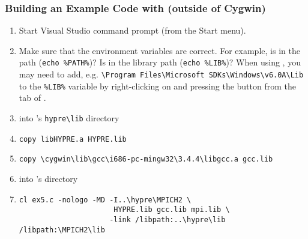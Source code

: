 \subsubsection{Building an Example Code with  (outside of Cygwin)}
\begin{enumerate}
\item Start Visual Studio command prompt (from the Start menu).
\item Make sure that the environment variables are correct. For example, is
 in the path (\verb|echo %PATH%|)? Is  in the
library path (\verb|echo %LIB%|)? When using , you may need to
add, e.g.
\verb|\Program Files\Microsoft SDKs\Windows\v6.0A\Lib| to the \verb|%LIB%|
variable by right-clicking on  and pressing the
 button from the  tab of
.
\item {} into \hypre{}'s \verb|hypre\lib| directory
\item \verb|copy libHYPRE.a HYPRE.lib|
\item \verb|copy \cygwin\lib\gcc\i686-pc-mingw32\3.4.4\libgcc.a gcc.lib|
\item {} into \hypre{}'s  directory
\item
\begin{verbatim}
cl ex5.c -nologo -MD -I..\hypre\MPICH2 \
                      HYPRE.lib gcc.lib mpi.lib \
                     -link /libpath:..\hypre\lib /libpath:\MPICH2\lib
\end{verbatim}
\end{enumerate}

